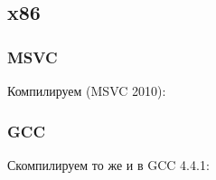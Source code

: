 \subsection{x86}

\subsubsection{MSVC}

Компилируем (MSVC 2010):





\subsubsection{GCC}

Скомпилируем то же и в GCC 4.4.1:


